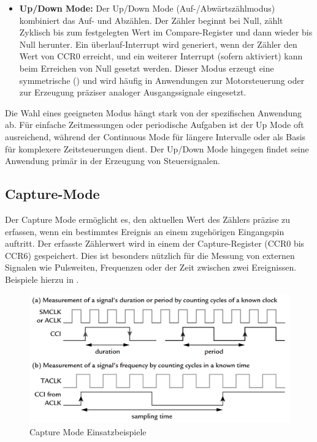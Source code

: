 \begin{itemize}
	\item \textbf{Up/Down Mode:} Der Up/Down Mode (Auf-/Abw\"artsz\"ahlmodus) kombiniert das Auf- und Abz\"ahlen. Der Z\"ahler beginnt bei Null, z\"ahlt Zyklisch bis zum festgelegten Wert im Compare-Register und dann wieder bis Null herunter. Ein \"uberlauf-Interrupt wird generiert, wenn der Z\"ahler den Wert von CCR0 erreicht, und ein weiterer Interrupt (sofern aktiviert) kann beim Erreichen von Null gesetzt werden.  Dieser Modus erzeugt eine symmetrische  () und wird h\"aufig in Anwendungen zur Motorsteuerung oder zur Erzeugung pr\"aziser analoger Ausgangssignale eingesetzt. 
\end{itemize}

Die Wahl eines geeigneten Modus h\"angt stark von der spezifischen Anwendung ab. F\"ur einfache Zeitmessungen oder periodische Aufgaben ist der Up Mode oft ausreichend, w\"ahrend der Continuous Mode f\"ur l\"angere Intervalle oder als Basis f\"ur komplexere Zeitsteuerungen dient. Der Up/Down Mode hingegen findet seine Anwendung prim\"ar in der Erzeugung von Steuersignalen.

\subsection{Capture-Mode}
\label{Timer_CaptureMode}

Der Capture Mode erm\"oglicht es, den aktuellen Wert des Z\"ahlers pr\"azise zu erfassen, wenn ein bestimmtes Ereignis an einem zugeh\"origen Eingangspin auftritt. Der erfasste Z\"ahlerwert wird in einem der Capture-Register (CCR0 bis CCR6) gespeichert. Dies ist besonders n\"utzlich f\"ur die Messung von externen Signalen wie Pulsweiten, Frequenzen oder der Zeit zwischen zwei Ereignissen. Beispiele hierzu in .

\begin{figure}[h!]
	\centering
	\includegraphics[width=1.0\textwidth]{../Bilder/CaptureMode_Beispiele.png}
	\caption{Capture Mode Einsatzbeispiele\\}
	\label{fig:CaptureModeBeispiele}
\end{figure}

